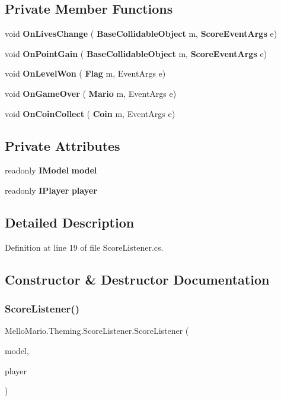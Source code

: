 \subsection*{Private Member Functions}
\begin{DoxyCompactItemize}
\item 
void \textbf{ On\+Lives\+Change} (\textbf{ Base\+Collidable\+Object} m, \textbf{ Score\+Event\+Args} e)
\item 
void \textbf{ On\+Point\+Gain} (\textbf{ Base\+Collidable\+Object} m, \textbf{ Score\+Event\+Args} e)
\item 
void \textbf{ On\+Level\+Won} (\textbf{ Flag} m, Event\+Args e)
\item 
void \textbf{ On\+Game\+Over} (\textbf{ Mario} m, Event\+Args e)
\item 
void \textbf{ On\+Coin\+Collect} (\textbf{ Coin} m, Event\+Args e)
\end{DoxyCompactItemize}
\subsection*{Private Attributes}
\begin{DoxyCompactItemize}
\item 
readonly \textbf{ I\+Model} \textbf{ model}
\item 
readonly \textbf{ I\+Player} \textbf{ player}
\end{DoxyCompactItemize}


\subsection{Detailed Description}


Definition at line 19 of file Score\+Listener.\+cs.



\subsection{Constructor \& Destructor Documentation}
\mbox{\label{classMelloMario_1_1Theming_1_1ScoreListener_a56a9688497adc6ab7f48fd4bcaca9775}} 
\subsubsection{Score\+Listener()}
{\footnotesize\ttfamily Mello\+Mario.\+Theming.\+Score\+Listener.\+Score\+Listener (\begin{DoxyParamCaption}\item[{\textbf{ I\+Model}}]{model,  }\item[{\textbf{ I\+Player}}]{player }\end{DoxyParamCaption})}



